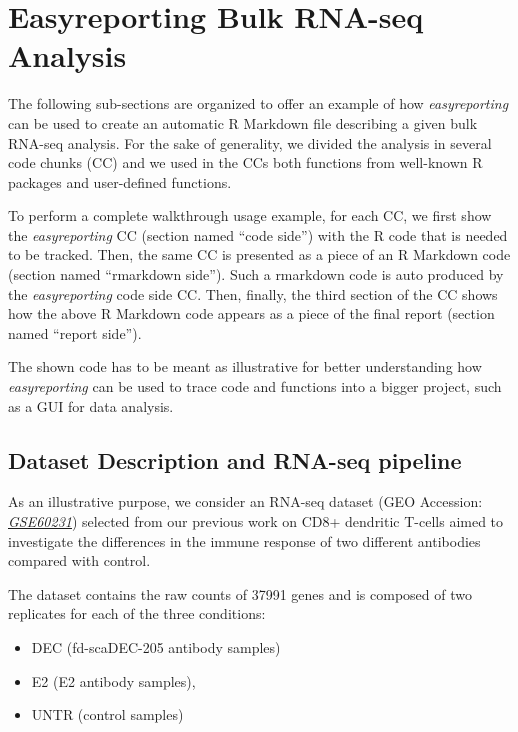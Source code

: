 \documentclass[
]{article}
\begin{document}
\hypertarget{easyreporting-bulk-rna-seq-analysis}{%
\section{Easyreporting Bulk RNA-seq
Analysis}\label{easyreporting-bulk-rna-seq-analysis}}

The following sub-sections are organized to offer an example of how
\emph{easyreporting} can be used to create an automatic R Markdown file
describing a given bulk RNA-seq analysis. For the sake of generality, we
divided the analysis in several code chunks (CC) and we used in the CCs
both functions from well-known R packages and user-defined functions.

To perform a complete walkthrough usage example, for each CC, we first
show the \emph{easyreporting} CC (section named ``code side'') with the
R code that is needed to be tracked. Then, the same CC is presented as a
piece of an R Markdown code (section named ``rmarkdown side''). Such a
rmarkdown code is auto produced by the \emph{easyreporting} code side
CC. Then, finally, the third section of the CC shows how the above R
Markdown code appears as a piece of the final report (section named
``report side'').

The shown code has to be meant as illustrative for better understanding
how \emph{easyreporting} can be used to trace code and functions into a
bigger project, such as a GUI for data analysis.

\hypertarget{dataset-description-and-rna-seq-pipeline}{%
\subsection{Dataset Description and RNA-seq
pipeline}\label{dataset-description-and-rna-seq-pipeline}}

As an illustrative purpose, we consider an RNA-seq dataset (GEO
Accession:
\href{https://www.ncbi.nlm.nih.gov/geo/query/acc.cgi?acc=GSE60231}{\emph{GSE60231}})
selected from our previous work on CD8+ dendritic T-cells aimed to
investigate the differences in the immune response of two different
antibodies compared with control.

The dataset contains the raw counts of 37991 genes and is composed of
two replicates for each of the three conditions:

\begin{itemize}
\item
  DEC (fd-scaDEC-205 antibody samples)
\item
  E2 (E2 antibody samples),
\item
  UNTR (control samples)
\end{itemize}
\end{document}
